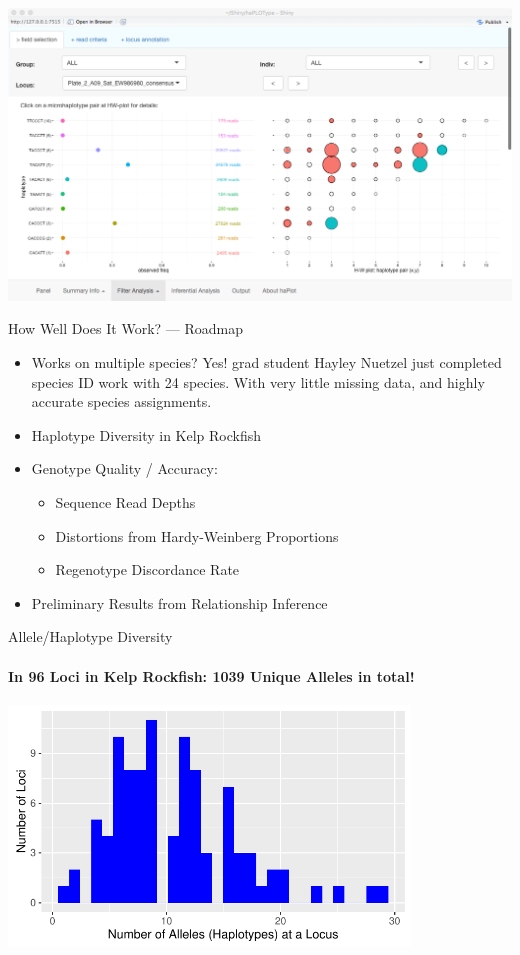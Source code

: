 \documentclass[letter,graphicx]{beamer}
\begin{document}
\newpage
\mbox{}
\vspace*{2em}
\mbox{}
\includegraphics[width=\textwidth]{figs/haplot2.png}



\begin{frame}{How Well Does It Work? --- Roadmap}

\begin{itemize}
\item Works on multiple species?  Yes! grad student Hayley Nuetzel just completed species ID work with 24 species.  With very little missing data, and highly accurate species assignments.
\item Haplotype Diversity in Kelp Rockfish
\item Genotype Quality / Accuracy:
\begin{itemize}
\item Sequence Read Depths
\item Distortions from Hardy-Weinberg Proportions
\item Regenotype Discordance Rate
\end{itemize}
\item Preliminary Results from Relationship Inference
\end{itemize}
\end{frame}



\begin{frame}{Allele/Haplotype Diversity}
\framesubtitle{In 96 Loci in Kelp Rockfish: 1039 Unique Alleles in total!}
\begin{center}
\includegraphics[width = 0.8\textwidth]{figs/alle-count-histo.pdf}
\end{center}
\end{frame}
\end{document}
